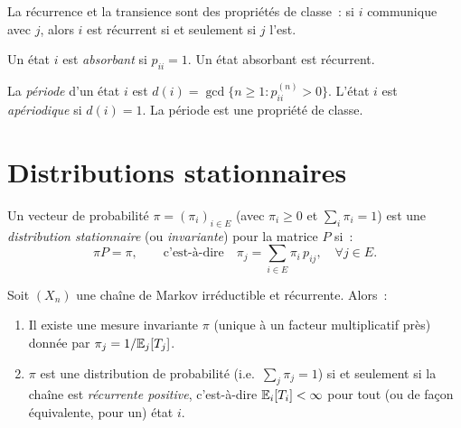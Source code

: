 \begin{proposition}
La r\'ecurrence et la transience sont des propri\'et\'es de classe~: si $i$
communique avec $j$, alors $i$ est r\'ecurrent si et seulement si $j$ l'est.
\end{proposition}

\begin{definition}
Un \'etat $i$ est \emph{absorbant} si $p_{ii} = 1$. Un \'etat absorbant est
r\'ecurrent.
\end{definition}

\begin{definition}[P\'eriode]
La \emph{p\'eriode} d'un \'etat $i$ est $d(i) = \gcd\{n \geq 1 : p_{ii}^{(n)} > 0\}$.
L'\'etat $i$ est \emph{ap\'eriodique} si $d(i) = 1$. La p\'eriode est une propri\'et\'e
de classe.
\end{definition}

\section{Distributions stationnaires}

\begin{definition}
\label{def:stationnaire}
Un vecteur de probabilit\'e $\pi = (\pi_i)_{i \in E}$ (avec $\pi_i \geq 0$ et
$\sum_i \pi_i = 1$) est une \emph{distribution stationnaire} (ou \emph{invariante})
pour la matrice $P$ si~:
\[
    \pi P = \pi, \qquad \text{c'est-\`a-dire} \quad
    \pi_j = \sum_{i \in E} \pi_i\, p_{ij}, \quad \forall j \in E.
\]
\end{definition}

\begin{theoreme}
\label{thm:existence_stationnaire}
Soit $(X_n)$ une cha\^ine de Markov irr\'eductible et r\'ecurrente. Alors~:
\begin{enumerate}
    \item Il existe une mesure invariante $\pi$ (unique \`a un facteur multiplicatif
    pr\`es) donn\'ee par $\pi_j = 1/\mathbb{E}_j[T_j]$.
    \item $\pi$ est une distribution de probabilit\'e (i.e.\ $\sum_j \pi_j = 1$) si
    et seulement si la cha\^ine est \emph{r\'ecurrente positive}, c'est-\`a-dire
    $\mathbb{E}_i[T_i] < \infty$ pour tout (ou de fa\c{c}on \'equivalente, pour un) \'etat $i$.
\end{enumerate}
\end{theoreme}

